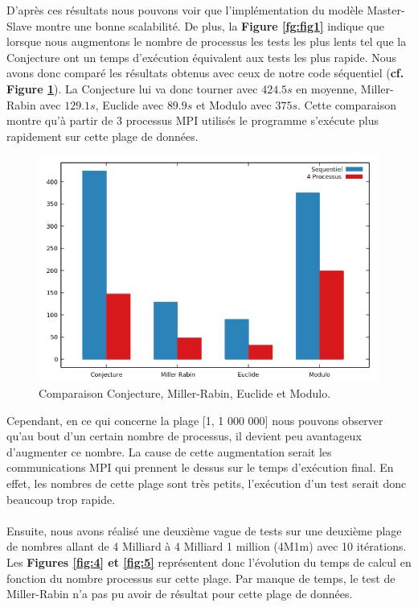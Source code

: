 D'après ces résultats nous pouvons voir que l'implémentation du modèle Master-Slave montre une bonne scalabilité. De plus, la \textbf{Figure \ref{fg:fig1}} indique que lorsque nous augmentons le nombre de processus les tests les plus lents tel que la Conjecture ont un temps d'exécution équivalent aux tests les plus rapide. Nous avons donc comparé les résultats obtenus avec ceux de notre code séquentiel (\textbf{cf. Figure \ref{fg:bar}}). La Conjecture lui va donc tourner avec $424.5s$ en moyenne, Miller-Rabin avec $129.1s$, Euclide avec $89.9s$ et Modulo avec $375s$. Cette comparaison montre qu'à partir de 3 processus MPI utilisés le programme s'exécute plus rapidement sur cette plage de données.
\begin{figure}[!ht]	
		\begin{center}\includegraphics[scale=0.6]{Bar1.png}\end{center}
		\caption{Comparaison Conjecture, Miller-Rabin, Euclide et Modulo. }
		\label{fg:bar}
\end{figure}

Cependant, en ce qui concerne la plage [1, 1 000 000] nous pouvons observer qu'au bout d'un certain nombre de processus, il devient peu avantageux d'augmenter ce nombre. La cause de cette augmentation serait les communications MPI qui prennent le dessus sur le temps d'exécution final. En effet, les nombres de cette plage sont très petits, l'exécution d'un test serait donc beaucoup trop rapide.\\


	\paragraph{}Ensuite, nous avons réalisé une deuxième vague de tests sur une deuxième plage de nombres allant de 4 Milliard à 4 Milliard 1 million (4M1m) avec 10 itérations. Les \textbf{Figures \ref{fig:4} et \ref{fig:5}} représentent donc l'évolution du temps de calcul en fonction du nombre processus sur cette plage. Par manque de temps, le test de Miller-Rabin n'a pas pu avoir de résultat pour cette plage de données.

